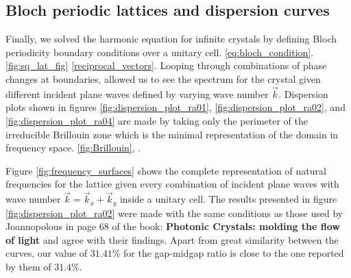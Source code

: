 \subsection{Bloch periodic lattices and dispersion curves}
Finally, we solved the harmonic equation for infinite crystals by defining Bloch periodicity boundary conditions over a unitary cell.  \ref{eq:bloch_condition}.  \ref{fig:sq_lat_fig}   \ref{reciprocal_vectors}.
Looping through combinations of phase changes at boundaries, allowed us to see the spectrum for the crystal given different incident plane waves defined by varying wave number $\vec{k}$. 
Dispersion plots shown in figures \ref{fig:dispersion_plot_ra01}, \ref{fig:dispersion_plot_ra02}, and \ref{fig:dispersion_plot_ra04} are made by taking only the perimeter of the irreducible Brillouin zone which is the minimal representation of the domain in frequency space. \ref{fig:Brillouin},  \cite{Kittel2005}. 

Figure \ref{fig:frequency_surfaces} shows the complete representation of natural frequencies for the lattice given every combination of incident plane waves with wave number $\vec{k} = \vec{k}_x+\vec{k}_y$ inside a unitary cell.
The results presented in figure \ref{fig:dispersion_plot_ra02} were made with the same conditions as those used by Joannopolous in page 68 of the book: \textbf{Photonic Crystals: molding the flow of light} \cite{Joannopoulos2008} and agree with their findings. Apart from great similarity between the curves, our value of $31.41\%$ for the gap-midgap ratio is close to the one reported by them of $31.4\%$.

